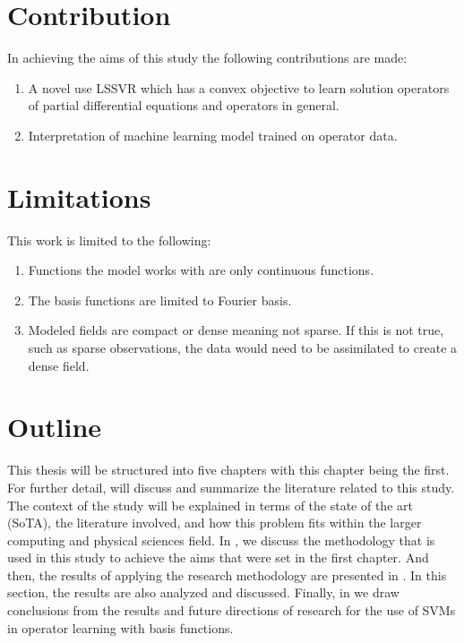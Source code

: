 \section{Contribution}
\noindent In achieving the aims of this study the following contributions are made:
\begin{enumerate}
    \item A novel use LSSVR which has a convex objective to learn solution operators of partial differential equations and operators in general.
    \item Interpretation of machine learning model trained on operator data.
\end{enumerate}

\section{Limitations}
\noindent This work is limited to the following:
\begin{enumerate}
    \item Functions the model works with are only continuous functions.
    \item The basis functions are limited to Fourier basis.
    \item Modeled fields are compact or dense meaning not sparse. If this is not true, such as sparse observations, the data would need to be assimilated to create a dense field.
\end{enumerate}

\section{Outline}
\noindent This thesis will be structured into five chapters with this chapter being the first. For further detail,  will discuss and summarize the literature related to this study. The context of the study will be explained in terms of the state of the art (SoTA), the literature involved, and how this problem fits within the larger computing and physical sciences field. In , we discuss the methodology that is used in this study to achieve the aims that were set in the first chapter. And then, the results of applying the research methodology are presented in . In this section, the results are also analyzed and discussed. Finally, in  we draw conclusions from the results and future directions of research for the use of SVMs in operator learning with basis functions.

